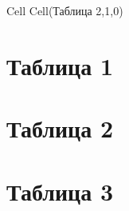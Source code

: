 \documentclass[a4paper,11pt]{article}
\begin{document}
Cell
Cell(Таблица 2,1,0)
	\section{Таблица 1}
	\section{Таблица 2}

	\section{Таблица 3}
\end{document}

